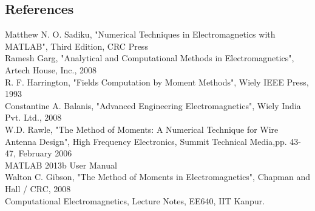 \documentclass[aps,prstab,twocolumn,superscriptaddress,groupedaddress,showkeys,nofootinbib]{revtex4}  %
\begin{document}
\begin{thebibliography}{99}
\section*{\large{References}}
Matthew N. O. Sadiku, "Numerical Techniques in Electromagnetics with MATLAB", Third Edition, CRC Press\\
Ramesh Garg, "Analytical and Computational Methods in Electromagnetics", Artech House, Inc., 2008\\
R. F. Harrington, "Fields Computation by Moment Methods", Wiely IEEE Press, 1993\\
Constantine A. Balanis, "Advanced Engineering Electromagnetics", Wiely India Pvt. Ltd., 2008\\
W.D. Rawle, "The Method of Moments: A Numerical Technique for Wire Antenna Design", High Frequency Electronics, Summit Technical Media,pp. 43-47,  February 2006\\
MATLAB 2013b User Manual\\
Walton C. Gibson, "The Method of Moments in Electromagnetics", Chapman and Hall / CRC, 2008\\
Computational Electromagnetics, Lecture Notes, EE640, IIT Kanpur.\\
\end{thebibliography}
\end{document}
